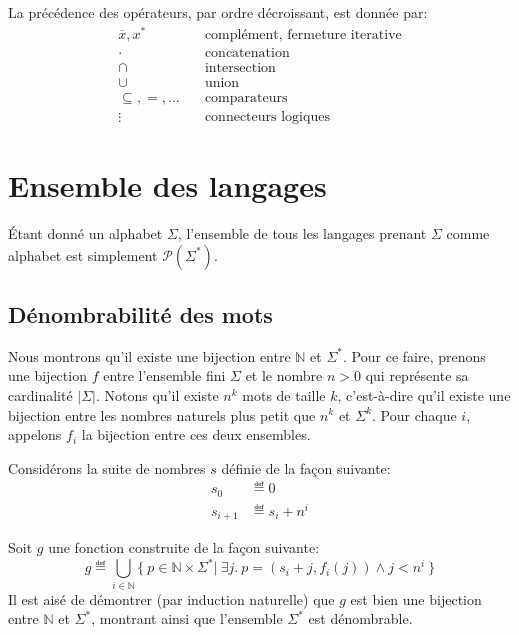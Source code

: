 La précédence des opérateurs, par ordre décroissant, est donnée par:
\begin{align*}
{\overline{x}}, x^* & \hspace{1em}\text{complément, fermeture iterative}\\
{\cdot} & \hspace{1em}\text{concatenation}\\
{\cap} & \hspace{1em}\text{intersection}\\
{\cup} & \hspace{1em}\text{union}\\
{\subseteq}, {=}, \dots & \hspace{1em}\text{comparateurs}\\
{\vdots} & \hspace{1em}\text{connecteurs logiques}
\end{align*}

\section{Ensemble des langages}

Étant donné un alphabet $\Sigma$, l'ensemble de tous les langages prenant $\Sigma$ comme alphabet est simplement $\mathcal{P}(\Sigma^*)$.

\subsection{Dénombrabilité des mots}

Nous montrons qu'il existe une bijection entre $\mathbb{N}$ et $\Sigma^*$.
Pour ce faire, prenons une bijection $f$ entre l'ensemble fini $\Sigma$ et le nombre $n > 0$ qui représente sa cardinalité $|\Sigma|$.
Notons qu'il existe $n^k$ mots de taille $k$, c'est-à-dire qu'il existe une bijection entre les nombres naturels plus petit que $n^k$ et $\Sigma^k$. Pour chaque $i$, appelons $f_i$ la bijection entre ces deux ensembles.

Considérons la suite de nombres $s$ définie de la façon suivante:
\begin{align*}
s_0 &\eqdef 0\\
s_{i + 1} &\eqdef s_i + n^i
\end{align*}

Soit $g$ une fonction construite de la façon suivante:
\[
g \eqdef \bigcup_{i \in \mathbb{N}} \{\ p \in \mathbb{N} \times \Sigma^* |\ \exists j.\ p = (s_i + j, f_i(j)) \wedge j < n^i\ \}
\]
Il est aisé de démontrer (par induction naturelle) que $g$ est bien une bijection entre $\mathbb{N}$ et $\Sigma^*$, montrant ainsi que l'ensemble $\Sigma^*$ est dénombrable.


